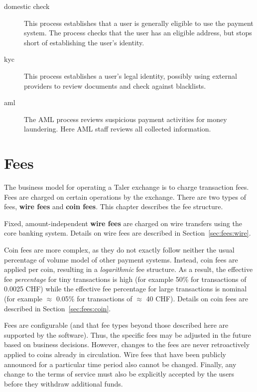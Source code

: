 \documentclass[10pt,a4paper,oneside]{book}
\begin{document}
\begin{description}
\item[domestic check] This process establishes that a user is generally
  eligible to use the payment system.  The process checks that the user has an
  eligible address, but stops short of establishing the user's identity.
\item[kyc] This process establishes a user's legal identity, possibly
  using external providers to review documents and check against blacklists.
\item[aml] The AML process reviews suspicious payment activities for
  money laundering. Here AML staff reviews all collected information.
\end{description}


%



\chapter{Fees} \label{chap:fees}

The business model for operating a Taler exchange is to charge transaction
fees.  Fees are charged on certain operations by the exchange.  There are two
types of fees, {\bf wire fees} and {\bf coin fees}.  This chapter describes
the fee structure.

Fixed, amount-independent {\bf wire fees} are charged on wire transfers using
the core banking system.  Details on wire fees are described in
Section~\ref{sec:fees:wire}.

Coin fees are more complex, as they do not exactly follow neither the usual
percentage of volume model of other payment systems.  Instead, coin fees are
applied per coin, resulting in a {\em logarithmic} fee structure.  As a
result, the effective fee {\em percentage} for tiny transactions is high (for
example 50\% for transactions of 0.0025 CHF) while the effective fee
percentage for large transactions is nominal (for example $\approx$ 0.05\% for
transactions of $\approx$ 40 CHF). Details on coin fees are described in
Section~\ref{sec:fees:coin}.

Fees are configurable (and that fee types beyond those described here are
supported by the software). Thus, the specific fees may be adjusted in the
future based on business decisions.  However, changes to the fees are never
retroactively applied to coins already in circulation.  Wire fees that have
been publicly announced for a particular time period also cannot be changed.
Finally, any change to the terms of service must also be explicitly accepted
by the users before they withdraw additional funds.




%
\end{document}
